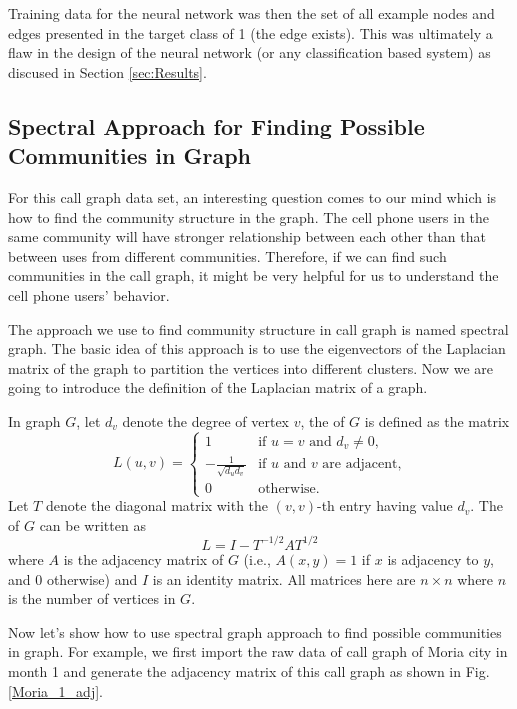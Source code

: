 Training data for the neural network was then the set of all example nodes and edges presented in the target class of 1 (the edge exists). This was ultimately a flaw in the design of the neural network (or any classification based system) as discused in Section \ref{sec:Results}.

\subsection{Spectral Approach for Finding Possible Communities in Graph}
For this call graph data set, an interesting question comes to our mind which is how to find the community structure in the graph. The cell phone users in the same community will have stronger relationship between each other than that between uses from different communities. Therefore, if we can find such communities in the call graph, it might be very helpful for us to understand the cell phone users' behavior.

The approach we use to find community structure in call graph is named spectral graph. The basic idea of this approach is to use the eigenvectors of the Laplacian matrix of the graph to partition the vertices into different clusters. Now we are going to introduce the definition of the Laplacian matrix of a graph. 

In graph $G$, let $d_v$ denote the degree of vertex $v$, the  of $G$ is defined as the matrix 
\begin{equation}
L(u,v) = \begin{cases} 1 & \text{if  $u=v$ and $d_v \ne 0$,} \\ -\frac{1}{\sqrt{d_ud_v}} & \text{if $u$ and $v$ are adjacent,} \\ 0 & \text{otherwise.}\end{cases}
\end{equation}    
Let $T$ denote the diagonal matrix with the $(v,v)$-th entry having value $d_v$. The  of $G$ can be written as 
\begin{equation}
L=I-T^{-1/2}AT^{1/2}
\end{equation}
where $A$ is the adjacency matrix of $G$ (i.e., $A(x,y)=1$ if $x$ is adjacency to $y$, and $0$ otherwise) and $I$ is an identity matrix. All matrices here are $n \times n$ where $n$ is the number of vertices in $G$.

Now let's show how to use spectral graph approach to find possible communities in graph. For example, we first import the raw data of call graph of Moria city in month 1 and generate the adjacency matrix of this call graph as shown in Fig. \ref{Moria_1_adj}.

